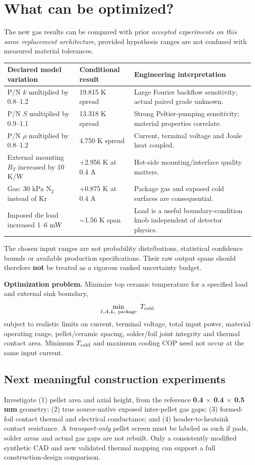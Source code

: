 \documentclass[10pt,a4paper]{article}
\begin{document}
\section{What can be optimized?}
The new gas results can be compared with prior \emph{accepted experiments on this same replacement architecture}, provided hypothesis ranges are not confused with measured material tolerances.
\begin{center}\small
\begin{tabularx}{\linewidth}{p{47mm}p{36mm}X}\toprule
Declared model variation & Conditional result & Engineering interpretation\\\midrule
P/N $k$ multiplied by 0.8--1.2 & 19.815 K spread & Large Fourier backflow sensitivity; actual paired grade unknown.\\
P/N $S$ multiplied by 0.9--1.1 & 13.318 K spread & Strong Peltier-pumping sensitivity; material properties correlate.\\
P/N $\rho$ multiplied by 0.8--1.2 & 4.750 K spread & Current, terminal voltage and Joule heat coupled.\\
External mounting $R_T$ increased by 10 K/W & +2.956 K at 0.4 A & Hot-side mounting/interface quality matters.\\
Gas: 30 kPa N$_2$ instead of Kr & +0.875 K at 0.4 A & Package gas and exposed cold surfaces are consequential.\\
Imposed die load increased 1--6 mW & $\sim$1.56 K span & Load is a useful boundary-condition knob independent of detector physics.\\\bottomrule
\end{tabularx}
\end{center}
The chosen input ranges are not probability distributions, statistical confidence bounds or available production specifications. Their raw output spans should therefore \textbf{not} be treated as a rigorous ranked uncertainty budget.

\textbf{Optimization problem.} Minimize top ceramic temperature for a specified load and external sink boundary,
\[
\min_{I,A,L,\ \mathrm{package}}\ T_{\rm cold}
\]
subject to realistic limits on current, terminal voltage, total input power, material operating range, pellet/ceramic spacing, solder/foil joint integrity and thermal contact area. Minimum $T_{\rm cold}$ and maximum cooling COP need not occur at the same input current.

\subsection{Next meaningful construction experiments}
Investigate (1) pellet area and axial height, from the reference \textbf{0.4 $\times$ 0.4 $\times$ 0.5 mm} geometry; (2) true source-native exposed inter-pellet gas gaps; (3) formed-foil contact thermal and electrical conductance; and (4) header-to-heatsink contact resistance. A \emph{transport-only} pellet screen must be labeled as such if pads, solder areas and actual gas gaps are not rebuilt. Only a consistently modified synthetic CAD and new validated thermal mapping can support a full construction-design comparison.
\clearpage
\end{document}
